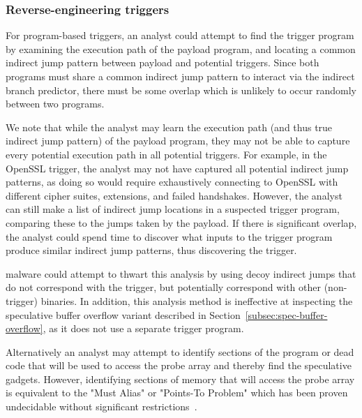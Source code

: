 \subsubsection{Reverse-engineering triggers}
For program-based triggers, an analyst could attempt to find the trigger program
by examining the execution path of the payload program, and locating a common
indirect jump pattern between payload and potential triggers. Since both
programs must share a common indirect jump pattern to interact via the indirect
branch predictor, there must be some overlap which is unlikely to occur randomly
between two programs.

We note that while the analyst may learn the execution path (and thus true
indirect jump pattern) of the payload program, they may not be able to capture
every potential execution path in all potential triggers. For example, in the
OpenSSL trigger, the analyst may not have captured all potential indirect jump
patterns, as doing so would require exhaustively connecting to OpenSSL with
different cipher suites, extensions, and failed handshakes. However, the analyst
can still make a list of indirect jump locations in a suspected trigger program,
comparing these to the jumps taken by the payload. If there is significant
overlap, the analyst could spend time to discover what inputs to the trigger
program produce similar indirect jump patterns, thus discovering the trigger.

\speculake malware could attempt to thwart this analysis by using decoy indirect
jumps that do not correspond with the trigger, but potentially correspond with
other (non-trigger) binaries. In addition, this analysis method is ineffective
at inspecting the speculative buffer overflow variant described in
Section~\ref{subsec:spec-buffer-overflow}, as it does not use a separate trigger
program.

Alternatively an analyst may attempt to identify sections of the program or dead 
code that will be used to access the probe array and thereby find the speculative 
gadgets. However, identifying sections of memory that will access the probe 
array is equivalent to the "Must Alias" or "Points-To Problem" which has been 
proven undecidable without significant 
restrictions~\cite{ramalingam1994undecidability,landi1992undecidability}.

%
%

